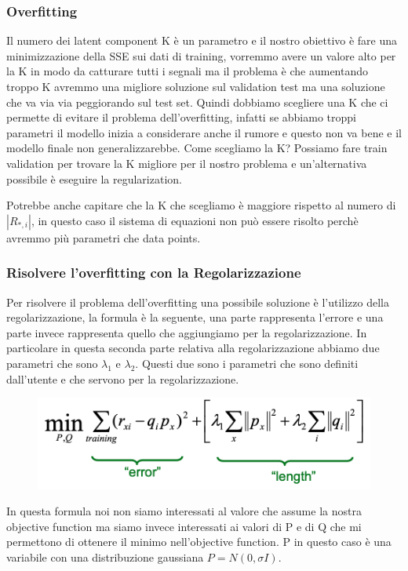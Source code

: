 \documentclass[14pt]{extreport}
\begin{document}
\subsubsection{Overfitting}

Il numero dei latent component K è un parametro e il nostro obiettivo è fare una minimizzazione della SSE sui dati di training, vorremmo avere un
valore alto per la K in modo da catturare tutti i segnali ma il problema è che aumentando troppo K avremmo una migliore soluzione sul validation test
ma una soluzione che va via via peggiorando sul test set. Quindi dobbiamo scegliere una K che ci permette di evitare il problema dell'overfitting,
infatti se abbiamo troppi parametri il modello inizia a considerare anche il rumore e questo non va bene e il modello finale non generalizzarebbe.
Come scegliamo la K? Possiamo fare train validation per trovare la K migliore per il nostro problema e un'alternativa possibile è eseguire la
regularization.

Potrebbe anche capitare che la K che scegliamo è maggiore rispetto al numero di $|R_{*,i}|$, in questo caso il sistema di equazioni non può essere
risolto perchè avremmo più parametri che data points.

\subsubsection{Risolvere l'overfitting con la Regolarizzazione}

Per risolvere il problema dell'overfitting una possibile soluzione è l'utilizzo della regolarizzazione, la formula è la seguente, una parte
rappresenta l'errore e una parte invece rappresenta quello che aggiungiamo per la regolarizzazione. In particolare in questa seconda parte relativa
alla regolarizzazione abbiamo due parametri che sono $\lambda_1$ e $\lambda_2$. Questi due sono i parametri che sono definiti dall'utente e che
servono per la regolarizzazione.

\begin{figure}[H]
	\centering
	\includegraphics[width=0.7\linewidth]{525.jpeg}
\end{figure}

In questa formula noi non siamo interessati al valore che assume la nostra objective function ma siamo invece interessati ai valori di P e di Q che mi
permettono di ottenere il minimo nell'objective function. P in questo caso è una variabile con una distribuzione gaussiana $P = N(0, \sigma I)$.
\end{document}
